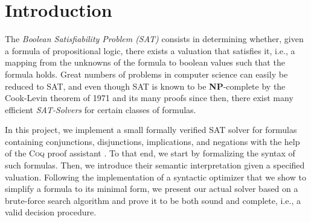\section{Introduction}\label{sec:intro}

The \emph{Boolean Satisfiability Problem (SAT)} consists in determining whether, given a formula of propositional logic, there exists a valuation that satisfies it, i.e., a mapping from the unknowns of the formula to boolean values such that the formula holds. 
Great numbers of problems in computer science can easily be reduced to SAT, and even though SAT is known to be \textbf{NP}-complete by the Cook-Levin theorem of 1971 \cite{cook1971} and its many proofs since then, there exist many efficient \emph{SAT-Solvers} for certain classes of formulas.

\bigbreak

In this project, we implement a small formally verified SAT solver for formulas containing conjunctions, disjunctions, implications, and negations with the help of the \textsc{Coq} proof assistant \cite{coq_ref_man}. 
To that end, we start by formalizing the syntax of such formulas. 
Then, we introduce their semantic interpretation given a specified valuation. 
Following the implementation of a syntactic optimizer that we show to simplify a formula to its minimal form, we present our actual solver based on a brute-force search algorithm and prove it to be both sound and complete, i.e., a valid decision procedure.